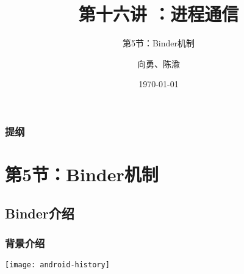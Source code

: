 


\title[第16讲]{第十六讲 ：进程通信} %
\subtitle{第5节：Binder机制}
\author{向勇、陈渝} %
\date{\today} %



\begin{frame}
\titlepage %
\end{frame}

\begin{frame}
\frametitle{提纲} %
\tableofcontents %

\end{frame}
\section{第5节：Binder机制} %
\subsection{Binder介绍} %
\begin{frame}[plain]
	\frametitle{背景介绍}
	\centering
	\texttt{[image: android-history]}
	
\end{frame}

